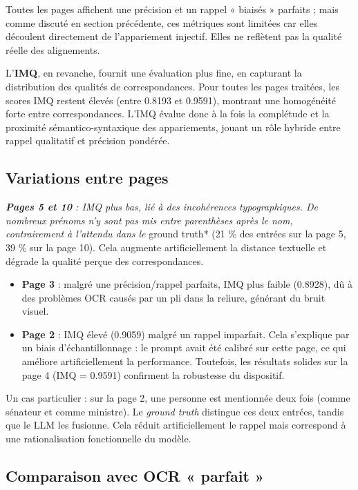 Toutes les pages affichent une précision et un rappel « biaisés » parfaits ; mais comme discuté en section précédente, ces métriques sont limitées car elles découlent directement de l’appariement injectif. Elles ne reflètent pas la qualité réelle des alignements.

L’\textbf{IMQ}, en revanche, fournit une évaluation plus fine, en capturant la distribution des qualités de correspondances. Pour toutes les pages traitées, les scores IMQ restent élevés (entre 0.8193 et 0.9591), montrant une homogénéité forte entre correspondances. L’IMQ évalue donc à la fois la complétude et la proximité sémantico-syntaxique des appariements, jouant un rôle hybride entre rappel qualitatif et précision pondérée.

\subsection{Variations entre pages}

\emph{ \textbf{Pages 5 et 10} : IMQ plus bas, lié à des incohérences typographiques. De nombreux prénoms n’y sont pas mis entre parenthèses après le nom, contrairement à l’attendu dans le }ground truth* (21 \% des entrées sur la page 5, 39 \% sur la page 10). Cela augmente artificiellement la distance textuelle et dégrade la qualité perçue des correspondances.

\begin{itemize}
\item \textbf{Page 3} : malgré une précision/rappel parfaits, IMQ plus faible (0.8928), dû à des problèmes OCR causés par un pli dans la reliure, générant du bruit visuel.

\item \textbf{Page 2} : IMQ élevé (0.9059) malgré un rappel imparfait. Cela s’explique par un biais d’échantillonnage : le prompt avait été calibré sur cette page, ce qui améliore artificiellement la performance. Toutefois, les résultats solides sur la page 4 (IMQ = 0.9591) confirment la robustesse du dispositif.

\end{itemize}
Un cas particulier : sur la page 2, une personne est mentionnée deux fois (comme sénateur et comme ministre). Le \emph{ground truth} distingue ces deux entrées, tandis que le LLM les fusionne. Cela réduit artificiellement le rappel mais correspond à une rationalisation fonctionnelle du modèle.

\subsection{Comparaison avec OCR « parfait »}

